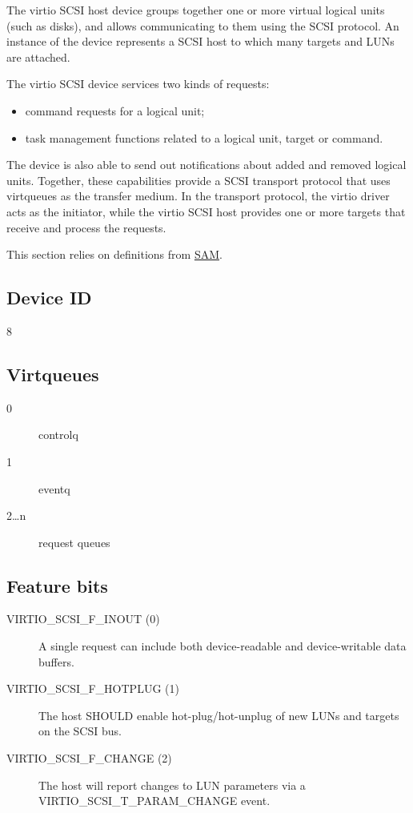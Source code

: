 The virtio SCSI host device groups together one or more virtual
logical units (such as disks), and allows communicating to them
using the SCSI protocol. An instance of the device represents a
SCSI host to which many targets and LUNs are attached.

The virtio SCSI device services two kinds of requests:
\begin{itemize}
\item command requests for a logical unit;

\item task management functions related to a logical unit, target or
  command.
\end{itemize}

The device is also able to send out notifications about added and
removed logical units. Together, these capabilities provide a
SCSI transport protocol that uses virtqueues as the transfer
medium. In the transport protocol, the virtio driver acts as the
initiator, while the virtio SCSI host provides one or more
targets that receive and process the requests.

This section relies on definitions from \hyperref[intro:SAM]{SAM}.

\subsection{Device ID}\label{sec:Device Types / SCSI Host Device / Device ID}
  8

\subsection{Virtqueues}\label{sec:Device Types / SCSI Host Device / Virtqueues}

\begin{description}
\item[0] controlq
\item[1] eventq
\item[2\ldots n] request queues
\end{description}

\subsection{Feature bits}\label{sec:Device Types / SCSI Host Device / Feature bits}

\begin{description}
\item[VIRTIO_SCSI_F_INOUT (0)] A single request can include both
    device-readable and device-writable data buffers.

\item[VIRTIO_SCSI_F_HOTPLUG (1)] The host SHOULD enable
    hot-plug/hot-unplug of new LUNs and targets on the SCSI bus.

\item[VIRTIO_SCSI_F_CHANGE (2)] The host will report changes to LUN
    parameters via a VIRTIO_SCSI_T_PARAM_CHANGE event.
\end{description}


